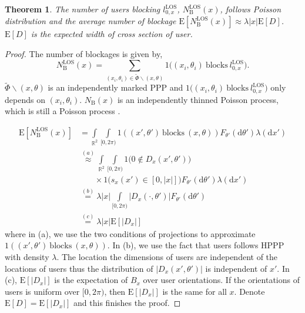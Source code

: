 \documentclass[10pt, conference, letterpaper]{IEEEtran}
\newtheorem{theorem}{Theorem}
\begin{document}
\begin{theorem}\label{theorem:E_N_B_LOS}
	The number of users blocking $l_{0,x}^{\mathrm{LOS}}$, $N_\mathrm{B}^\mathrm{LOS}(x)$, follows Poisson distribution and the average number of blockage $\mathrm{E}[N_{\mathrm{B}}^\mathrm{LOS}(x)] \approx \lambda |x| \mathrm{E}[D]$. $\mathrm{E}[D]$ is the expected width of cross section of user.  
\end{theorem}
\begin{proof}
	The number of blockages is given by,
	\begin{equation*}
	N_{\mathrm{B}}^\mathrm{LOS}(x) = \sum_{(x_i, \theta_i)\in \tilde{\Phi}\backslash(x,\theta)}1\big((x_i, \theta_i) \mathrm{~blocks~} l_{0,x}^{\mathrm{LOS}}\big).
	\end{equation*}
	$\tilde{\Phi}\backslash(x,\theta)$ is an independently marked PPP and $1\big((x_i, \theta_i) \mathrm{~blocks~} l_{0,x}^{\mathrm{LOS}}\big)$ only depends on $(x_i, \theta_i)$. $N_{\mathrm{B}}(x)$ is an independently thinned Poisson process, which is still a Poisson process \cite{stochasticgeometry}. 
	
	\begin{align}
	\mathrm{E}[N_{\mathrm{B}}^\mathrm{LOS}(x)] & =  \int\limits_{\mathbb{R}^2}\int\limits_{[0,2\pi)}\mathrm{1}((x',\theta')\mathrm{~blocks~}(x,\theta))F_{\theta'}(\mathrm{d}\theta')\lambda(\mathrm{d}x') \nonumber\\
	& \stackrel{(a)}{\approx} \int\limits_{\mathbb{R}^2}\int\limits_{[0,2\pi)}\mathrm{1}\big(0\notin D_x(x',\theta')\big) \nonumber\\
	& \phantom{{}=1} \times \mathrm{1}\big(s_{x}(x')\in[0,|x|]\big) F_{\theta'}(\mathrm{d}\theta')\lambda(\mathrm{d}x') \label{eq:2dblocking} \\
	& \stackrel{(b)} = \lambda|x|\int\limits_{[0,2\pi)}|D_x(\cdot, \theta')| F_{\theta'}(\mathrm{d}\theta') \nonumber\\
	& \stackrel{(c)} = \lambda|x|\mathrm{E}[|D_x|] \label{eq:N_blockage_original}
	\end{align}
	where in (a), we use the two conditions of projections to approximate $\mathrm{1}((x',\theta')\mathrm{~blocks~}(x,\theta))$. In (b), we use the fact that users follows HPPP with density $\lambda$. The location the dimensions of users are independent of the locations of users thus the distribution of $|D_x(x', \theta')|$ is independent of $x'$. In (c), $\mathrm{E}[|D_x|]$ is the expectation of $B_x$ over user orientations. If the orientations of users is uniform over $[0, 2\pi)$, then $\mathrm{E}[|D_x|]$ is the same for all $x$. Denote $\mathrm{E}[D] = \mathrm{E}[|D_x|]$ and this finishes the proof.
\end{proof}
\end{document}
